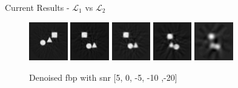\documentclass[aspectratio=169]{beamer}
\begin{document}
\begin{frame}{Current Results - $\mathcal{L}_1$ vs $\mathcal{L}_2$}
    \begin{figure}
        \includegraphics[width=0.15\textwidth]{denoised_fbp_5}
        \includegraphics[width=0.15\textwidth]{denoised_fbp_0}
        \includegraphics[width=0.15\textwidth]{denoised_fbp_n5}
        \includegraphics[width=0.15\textwidth]{denoised_fbp_n10}
        \includegraphics[width=0.15\textwidth]{denoised_fbp_n20}
        \caption{Denoised fbp with snr [5, 0, -5, -10 ,-20]}
    \end{figure}
    
\end{frame}
\end{document}
